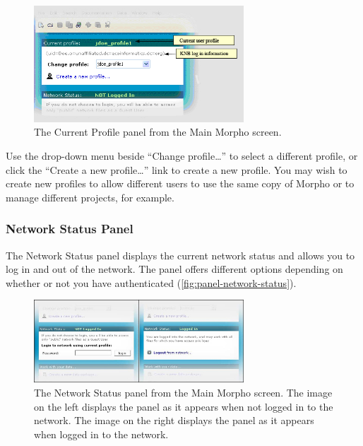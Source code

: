 \begin{figure}
  \centering
    \includegraphics[width=0.7\textwidth]{images/panel-profile.jpg}
  \caption{The Current Profile panel from the Main Morpho screen.}
  \label{fig:panel-profile}
\end{figure}

Use the drop-down menu beside ``Change profile\ldots'' to select a
different profile, or click the ``Create a new profile\ldots'' link to
create a new profile. You may wish to create new profiles to allow
different users to use the same copy of Morpho or to manage different
projects, for example.

\subsubsection[Network Status]{Network Status Panel}
\label{sec:panel-network-status}

The Network Status panel displays the current network status and allows
you to log in and out of the network. The panel offers different
options depending on whether or not you have authenticated 
(\autoref{fig:panel-network-status}).

\begin{figure}
  \centering
    \includegraphics[width=0.7\textwidth]{images/panel-network-status.jpg}
  \caption{The Network Status panel from the Main Morpho screen. The
    image on the left displays the panel as it appears when not logged
    in to the network. The image on the right displays the panel as
    it appears when logged in to the network.}
  \label{fig:panel-network-status}
\end{figure}

